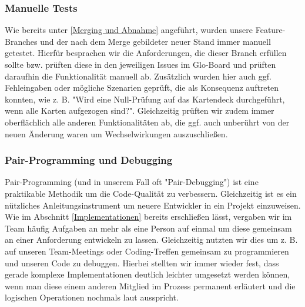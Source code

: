 \subsubsection{Manuelle Tests}
Wie bereits unter \ref{Merging und Abnahme} angeführt, wurden unsere Feature-Branches und der nach dem Merge gebildeter neuer Stand immer manuell getestet. Hierfür besprachen wir die Anforderungen, die dieser Branch erfüllen sollte bzw. prüften diese in den jeweiligen Issues im Glo-Board und prüften daraufhin die Funktionalität manuell ab. Zusätzlich wurden hier auch ggf. Fehleingaben oder mögliche Szenarien geprüft, die als Konsequenz auftreten konnten, wie z. B. "Wird eine Null-Prüfung auf das Kartendeck durchgeführt, wenn alle Karten aufgezogen sind?". Gleichzeitig prüften wir zudem immer oberflächlich alle anderen Funktionalitäten ab, die ggf. auch unberührt von der neuen Änderung waren um Wechselwirkungen auszuschließen. 

\subsubsection{Pair-Programming und Debugging}
Pair-Programming (und in unserem Fall oft "Pair-Debugging") ist eine praktikable Methodik um die Code-Qualität zu verbessern. Gleichzeitig ist es ein nützliches Anleitungsinstrument um neuere Entwickler in ein Projekt einzuweisen.
Wie im Abschnitt \ref{Implementationen} bereits erschließen lässt, vergaben wir im Team häufig Aufgaben an mehr als eine Person auf einmal um diese gemeinsam an einer Anforderung entwickeln zu lassen. Gleichzeitig nutzten wir dies um z. B. auf unseren Team-Meetings oder Coding-Treffen gemeinsam zu programmieren und unseren Code zu debuggen. Hierbei stellten wir immer wieder fest, dass gerade komplexe Implementationen deutlich leichter umgesetzt werden können, wenn man diese einem anderen Mitglied im Prozess permanent erläutert und die logischen Operationen nochmals laut ausspricht. 

